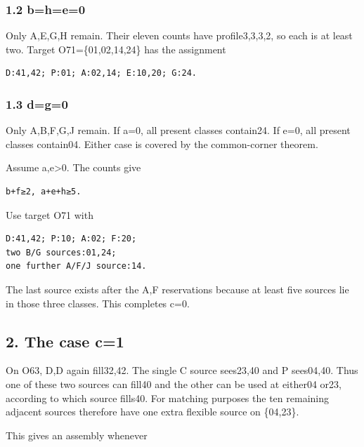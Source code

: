 \documentclass[
  10pt,
]{article}
\begin{document}
\hypertarget{bhe0}{%
\subsubsection*{1.2 b=h=e=0}\label{bhe0}}

Only A,E,G,H remain. Their eleven counts have profile3,3,3,2, so each is
at least two. Target O71=\{01,02,14,24\} has the assignment

\begin{verbatim}
D:41,42; P:01; A:02,14; E:10,20; G:24.
\end{verbatim}

\hypertarget{dg0}{%
\subsubsection*{1.3 d=g=0}\label{dg0}}

Only A,B,F,G,J remain. If a=0, all present classes contain24. If e=0,
all present classes contain04. Either case is covered by the
common-corner theorem.

Assume a,e\textgreater0. The counts give

\begin{verbatim}
b+f≥2, a+e+h≥5.
\end{verbatim}

Use target O71 with

\begin{verbatim}
D:41,42; P:10; A:02; F:20;
two B/G sources:01,24;
one further A/F/J source:14.
\end{verbatim}

The last source exists after the A,F reservations because at least five
sources lie in those three classes. This completes c=0.

\hypertarget{the-case-c1}{%
\subsection*{2. The case c=1}\label{the-case-c1}}

On O63, D,D again fill32,42. The single C source sees23,40 and P
sees04,40. Thus one of these two sources can fill40 and the other can be
used at either04 or23, according to which source fills40. For matching
purposes the ten remaining adjacent sources therefore have one extra
flexible source on \{04,23\}.

This gives an assembly whenever
\end{document}
